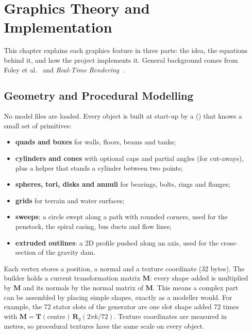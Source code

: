 \documentclass[11pt,a4paper]{report}
\newcommand{\code}[1]{\texttt{\detokenize{#1}}}
\newcommand{\mat}[1]{\mathbf{#1}}
\begin{document}
\chapter{Graphics Theory and Implementation}
\label{ch:theory}

This chapter explains each graphics feature in three parts: the idea, the equations
behind it, and how the project implements it. General background comes from
Foley et al.~\cite{foley} and \emph{Real-Time Rendering}~\cite{rtr}.

\section{Geometry and Procedural Modelling}
\label{sec:geometry}

No model files are loaded. Every object is built at start-up by a \code{MeshBuilder}
(\code{core/Mesh.cpp}) that knows a small set of primitives:

\begin{itemize}
  \item \textbf{quads and boxes} for walls, floors, beams and tanks;
  \item \textbf{cylinders and cones} with optional caps and partial angles (for
        cut-aways), plus a helper that stands a cylinder between two points;
  \item \textbf{spheres, tori, disks and annuli} for bearings, bolts, rings and flanges;
  \item \textbf{grids} for terrain and water surfaces;
  \item \textbf{sweeps}: a circle swept along a path with rounded corners, used for the
        penstock, the spiral casing, bus ducts and flow lines;
  \item \textbf{extruded outlines}: a 2D profile pushed along an axis, used for the
        cross-section of the gravity dam.
\end{itemize}

Each vertex stores a position, a normal and a texture coordinate (32 bytes). The
builder holds a current transformation matrix $\mat{M}$: every shape added is
multiplied by $\mat{M}$ and its normals by the normal matrix of $\mat{M}$. This means
a complex part can be assembled by placing simple shapes, exactly as a modeller would.
For example, the 72 stator slots of the generator are one slot shape added 72 times
with $\mat{M} = \mat{T}(\text{centre})\,\mat{R}_y(2\pi k/72)$. Texture coordinates are
measured in metres, so procedural textures have the same scale on every object.
\end{document}

